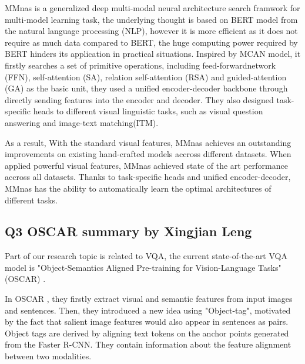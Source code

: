 \documentclass[12pt, a4paper]{article}
\begin{document}
\par\noindent \newline MMnas \cite{DBLP:journals/corr/abs-2004-12070} is a generalized deep multi-modal neural architecture search framwork for multi-model learning task, the underlying thought is based on BERT model from the natural language processing (NLP), however it is more efficient as it does not require as much data compared to BERT, the huge computing power required by BERT hinders its application in practical situations. Inspired by MCAN model, it firstly searches a set of primitive operations, including feed-forwardnetwork (FFN), self-attention (SA), relation self-attention (RSA) and guided-attention (GA) as the basic unit, they used a unified encoder-decoder backbone through directly sending features into the encoder and decoder. They also designed task-specific heads to different visual linguistic tasks, such as visual question answering and image-text matching(ITM).

\par\noindent \newline As a result, With the standard visual features, MMnas \cite{DBLP:journals/corr/abs-2004-12070} achieves an outstanding improvements on existing hand-crafted models accross different datasets. When applied powerful visual features, MMnas achieved state of the art performance accross all datasets. Thanks to task-specific heads and unified encoder-decoder, MMnas \cite{DBLP:journals/corr/abs-2004-12070} has the ability to automatically learn the optimal architectures of different tasks. 

\subsection*{Q3 OSCAR summary by Xingjian Leng}
\par\noindent \newline Part of our research topic is related to VQA, the current state-of-the-art VQA model is "Object-Semantics Aligned Pre-training for Vision-Language Tasks" (OSCAR) \cite{DBLP:journals/corr/abs-2004-06165}.

\par\noindent \newline In OSCAR \cite{DBLP:journals/corr/abs-2004-06165}, they firstly extract visual and semantic features from input images and sentences. Then, they introduced a new idea using "Object-tag", motivated by the fact that salient image features would also appear in sentences as pairs. Object tags are derived by aligning text tokens on the anchor points generated from the Faster R-CNN. They contain information about the feature alignment between two modalities. 
\end{document}

